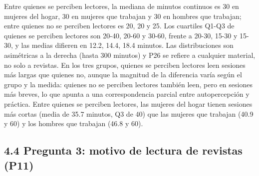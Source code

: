 \documentclass[
  spanish,
  12pt,
]{extarticle}
\begin{document}
Entre quienes se perciben lectores, la mediana de minutos continuos es
30 en mujeres del hogar, 30 en mujeres que trabajan y 30 en hombres que
trabajan; entre quienes no se perciben lectores es 20, 20 y 25. Los
cuartiles Q1-Q3 de quienes se perciben lectores son 20-40, 20-60 y
30-60, frente a 20-30, 15-30 y 15-30, y las medias difieren en 12.2,
14.4, 18.4 minutos. Las distribuciones son asimétricas a la derecha
(hasta 300 minutos) y P26 se refiere a cualquier material, no solo a
revistas. En los tres grupos, quienes se perciben lectores leen sesiones
más largas que quienes no, aunque la magnitud de la diferencia varía
según el grupo y la medida: quienes no se perciben lectores también
leen, pero en sesiones más breves, lo que apunta a una correspondencia
parcial entre autopercepción y práctica. Entre quienes se perciben
lectores, las mujeres del hogar tienen sesiones más cortas (media de
35.7 minutos, Q3 de 40) que las mujeres que trabajan (40.9 y 60) y los
hombres que trabajan (46.8 y 60).

\subsection{4.4 Pregunta 3: motivo de lectura de revistas
(P11)}\label{pregunta-3-motivo-de-lectura-de-revistas-p11}
\end{document}
